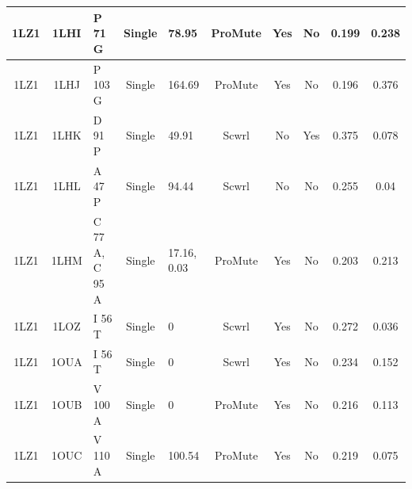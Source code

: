 \documentclass[sigconf]{acmart}
\begin{document}
\begin{table}[h]
{\begin{tabular}{|c|c|p{2.8cm}|c|p{2.8cm}|c|c|c|c|c|}
		1LZ1 & 1LHI & P 71 G & Single & 78.95 & ProMute & Yes & No & 0.199 & 0.238 \\ \hline
		1LZ1 & 1LHJ & P 103 G & Single & 164.69 & ProMute & Yes & No & 0.196 & 0.376 \\ \hline
		1LZ1 & 1LHK & D 91 P & Single & 49.91 & Scwrl & No & Yes & 0.375 & 0.078 \\ \hline
		1LZ1 & 1LHL & A 47 P & Single & 94.44 & Scwrl & No & No & 0.255 & 0.04 \\ \hline
		1LZ1 & 1LHM & C 77 A, C 95 A & Single & 17.16, 0.03 & ProMute & Yes & No & 0.203 & 0.213 \\ \hline
		1LZ1 & 1LOZ & I 56 T & Single & 0 & Scwrl & Yes & No & 0.272 & 0.036 \\ \hline
		1LZ1 & 1OUA & I 56 T & Single & 0 & Scwrl & Yes & No & 0.234 & 0.152 \\ \hline
		1LZ1 & 1OUB & V 100 A & Single & 0 & ProMute & Yes & No & 0.216 & 0.113 \\ \hline
		1LZ1 & 1OUC & V 110 A & Single & 100.54 & ProMute & Yes & No & 0.219 & 0.075 \\ \hline
	\end{tabular}}
\end{table}
\end{document}
